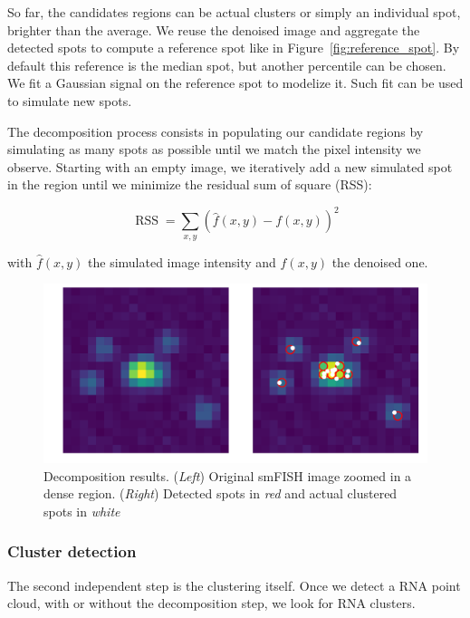 So far, the candidates regions can be actual clusters or simply an individual spot, brighter than the average.
We reuse the denoised image and aggregate the detected spots to compute a reference spot like in Figure~\ref{fig:reference_spot}.
By default this reference is the median spot, but another percentile can be chosen.
We fit a Gaussian signal on the reference spot to modelize it.
Such fit can be used to simulate new spots.

The decomposition process consists in populating our candidate regions by simulating as many spots as possible until we match the pixel intensity we observe.
Starting with an empty image, we iteratively add a new simulated spot in the region until we minimize the residual sum of square (RSS):

\begin{equation}
	{\displaystyle \operatorname{RSS} = \sum _{x, y}(\hat{f}(x, y) - f(x, y))^{2}}
\end{equation}

\noindent
with $\hat{f}(x, y)$ the simulated image intensity and $f(x, y)$ the denoised one.

\begin{figure}[h]
    \centering
    \includegraphics[width=1\textwidth]{figures/chapter2/plot_dense_decomposition}
    \caption{Decomposition results.
	(\textit{Left}) Original smFISH image zoomed in a dense region.
	(\textit{Right}) Detected spots in \textit{red} and actual clustered spots in \textit{white}}
    \label{fig:dense_decomposition}
\end{figure}

\subsubsection{Cluster detection}

The second independent step is the clustering itself.
Once we detect a \ac{RNA} point cloud, with or without the decomposition step, we look for \ac{RNA} clusters.

